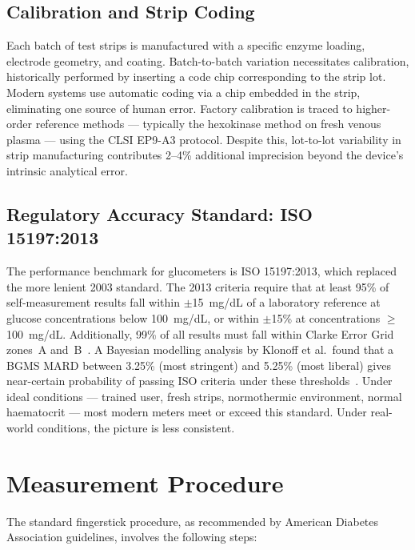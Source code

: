 \subsection*{Calibration and Strip Coding}

Each batch of test strips is manufactured with a specific enzyme loading, electrode geometry, and coating. Batch-to-batch variation necessitates calibration, historically performed by inserting a code chip corresponding to the strip lot. Modern systems use automatic coding via a chip embedded in the strip, eliminating one source of human error. Factory calibration is traced to higher-order reference methods --- typically the hexokinase method on fresh venous plasma --- using the CLSI EP9-A3 protocol. Despite this, lot-to-lot variability in strip manufacturing contributes 2--4\% additional imprecision beyond the device's intrinsic analytical error.

\subsection*{Regulatory Accuracy Standard: ISO 15197:2013}

The performance benchmark for glucometers is ISO 15197:2013, which replaced the more lenient 2003 standard. The 2013 criteria require that at least 95\% of self-measurement results fall within $\pm$15~mg/dL of a laboratory reference at glucose concentrations below 100~mg/dL, or within $\pm$15\% at concentrations $\geq$100~mg/dL. Additionally, 99\% of all results must fall within Clarke Error Grid zones~A and~B~\cite{freckmann2022mard}. A Bayesian modelling analysis by Klonoff et al.\ found that a BGMS MARD between 3.25\% (most stringent) and 5.25\% (most liberal) gives near-certain probability of passing ISO criteria under these thresholds~\cite{iso_mard_bayesian}. Under ideal conditions --- trained user, fresh strips, normothermic environment, normal haematocrit --- most modern meters meet or exceed this standard. Under real-world conditions, the picture is less consistent.

\section{Measurement Procedure}

The standard fingerstick procedure, as recommended by American Diabetes Association guidelines, involves the following steps:

